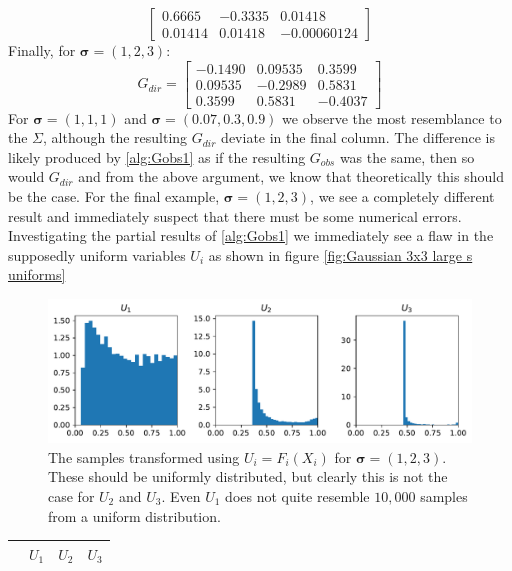 \documentclass[../Thesis.tex]{subfiles}
\begin{document}
\begin{example}
\begin{equation}
\begin{bmatrix}
            0.6665  & -0.3335 & 0.01418     \\
            0.01414 & 0.01418 & -0.00060124
        \end{bmatrix}
    \end{equation}
    Finally, for $\boldsymbol\sigma = (1,2,3)$:
    $$ G_{dir} =
        \begin{bmatrix}
            -0.1490 & 0.09535 & 0.3599  \\
            0.09535 & -0.2989 & 0.5831  \\
            0.3599  & 0.5831  & -0.4037
        \end{bmatrix}
    $$
    For $\boldsymbol\sigma = (1,1,1)$ and $\boldsymbol\sigma = (0.07, 0.3, 0.9)$ we observe the most resemblance to the $\Sigma$, although the resulting $G_{dir}$ deviate in the final column. The difference is likely produced by \autoref{alg:Gobs1} as if the resulting $G_{obs}$ was the same, then so would $G_{dir}$ and from the above argument, we know that theoretically this should be the case. For the final example, $\boldsymbol\sigma = (1,2,3)$, we see a completely different result and immediately suspect that there must be some numerical errors. Investigating the partial results of \autoref{alg:Gobs1} we immediately see a flaw in the supposedly uniform variables $U_i$ as shown in figure \autoref{fig:Gaussian 3x3 large s uniforms}
    \begin{figure}[H]
        \centering
        \includegraphics[width=0.99\linewidth]{figures/ND examples/Gaussian 3x3 large s uniforms.pdf}
        \caption{The samples transformed using $U_i = F_i(X_i)$ for $\boldsymbol\sigma = (1,2,3)$. These should be uniformly distributed, but clearly this is not the case for $U_2$ and $U_3$. Even $U_1$ does not quite resemble $10{,}000$ samples from a uniform distribution.}
        \label{fig:Gaussian 3x3 large s uniforms}
    \end{figure}
    \begin{table}[h]
        \centering
        \begin{tabular}{c|c|c|c}
                    & $U_1$    & $U_2$   & $U_3$   \\\hline

\end{tabular}
\end{table}
\end{example}
\end{document}
